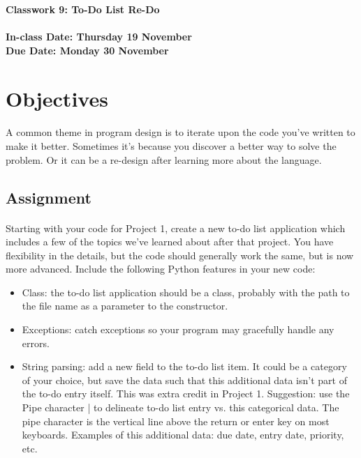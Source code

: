 \documentclass[letter,10pt]{article}
\begin{document}
    
    \huge
    \textbf{Classwork 9: To-Do List Re-Do}
    \normalsize
    \\ ~~ \\
    \textbf{In-class Date: Thursday 19 November} \\
    \textbf{Due Date: Monday 30 November}
    
    \section*{Objectives}
    \paragraph{}A common theme in program design is to iterate upon the code you've written to make it better. Sometimes it's because you discover a better way to solve the problem. Or it can be a re-design after learning more about the language.
    
    \subsection*{Assignment}
    \paragraph{}Starting with your code for Project 1, create a new to-do list application which includes a few of the topics we've learned about after that project. You have flexibility in the details, but the code should generally work the same, but is now more advanced. Include the following Python features in your new code:
    \begin{itemize}
        \item Class: the to-do list application should be a class, probably with the path to the file name as a parameter to the constructor.
        \item Exceptions: catch exceptions so your program may gracefully handle any errors.
        \item String parsing: add a new field to the to-do list item. It could be a category of your choice, but save the data such that this additional data isn't part of the to-do entry itself. This was extra credit in Project 1. Suggestion: use the Pipe character | to delineate to-do list entry vs. this categorical data. The pipe character is the vertical line above the return or enter key on most keyboards. Examples of this additional data: due date, entry date, priority, etc.
    \end{itemize}
    
\end{document}
